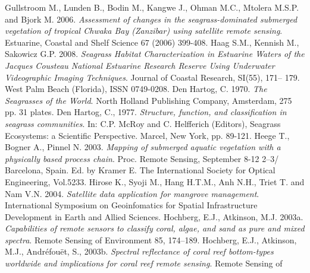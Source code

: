 \documentclass[11pt]{article}
\begin{document}
\begin{thebibliography}{999}
Gullstroom M., Lunden B., Bodin M., Kangwe J., Ohman M.C., Mtolera M.S.P. and Bjork M. 2006. \emph{Assessment of changes in the seagrass-dominated submerged vegetation of tropical Chwaka Bay (Zanzibar) using satellite remote sensing}. Estuarine, Coastal and Shelf
Science 67 (2006) 399-408. \pageref{Gullstroom06}
Haag S.M., Kennish M., Sakowicz G.P. 2008. \emph{Seagrass Habitat Characterization in Estuarine Waters of the Jacques Cousteau National Estuarine Research Reserve Using
Underwater Videographic Imaging Techniques}. Journal of Coastal Research, SI(55), 171–
179. West Palm Beach (Florida), ISSN 0749-0208. \pageref{Haag08}
Den Hartog, C. 1970. \emph{The Seagrasses of the World}. North Holland Publishing Company,
Amsterdam, 275 pp. 31 plates. \pageref{DenHartog70}
Den Hartog, C., 1977. \emph{Structure, function, and classification in seagrass communities}.
In: C.P. McRoy and C. Helfferich (Editors), Seagrass Ecosystems: a Scientific Perspective.
Marcel, New York, pp. 89-121. \pageref{DenHartog77}
Heege T., Bogner A., Pinnel N. 2003. \emph{Mapping of submerged aquatic vegetation with a physically based process chain}. Proc. Remote Sensing, September 8-12 2--3/ Barcelona,
Spain. Ed. by Kramer E. The International Society for Optical Engineering, Vol.5233. \pageref{Heege03}
Hirose K., Syoji M., Hang H.T.M., Anh N.H., Triet T. and Nam V.N. 2004. \emph{Satellite data application for mangrove management}. International Symposium on Geoinfomatics for Spatial Infrastructure Development in Earth and Allied Sciences. \pageref{Hirose04} 
Hochberg, E.J., Atkinson, M.J. 2003a. \emph{Capabilities of remote sensors to classify coral,
algae, and sand as pure and mixed spectra}. Remote Sensing of Environment 85, 174–189. \pageref{Hochberg03a}
Hochberg, E.J., Atkinson, M.J., Andr\'efou\"et, S., 2003b. \emph{Spectral reflectance of coral reef bottom-types worldwide and implications for coral reef remote sensing}. Remote Sensing of

\end{thebibliography}
\end{document}
